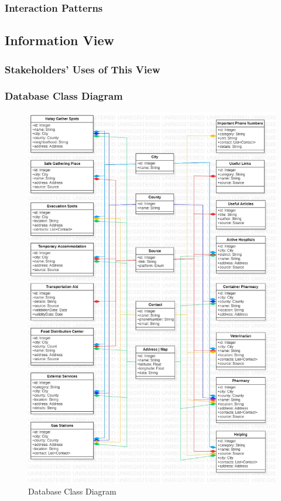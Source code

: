 \subsubsection{Interaction Patterns}

\subsection{Information View}

\subsubsection{Stakeholders' Uses of This View}

\subsubsection{Database Class Diagram}

\begin{figure}[H]
  \centering
  \includegraphics[width=\linewidth]{img/database-class-diagram.jpg}
  \caption{Database Class Diagram}
\end{figure}

